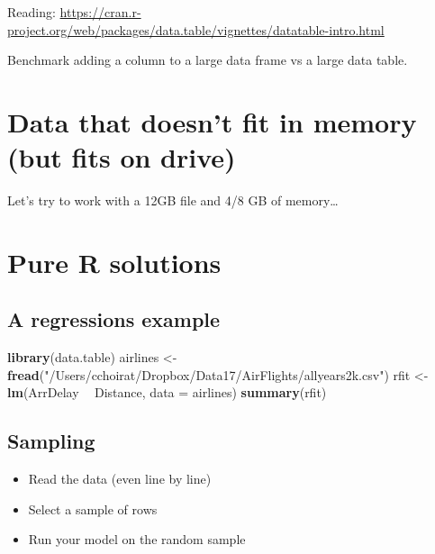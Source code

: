 \documentclass[]{book}
\newenvironment{Shaded}{\begin{snugshade}}{\end{snugshade}}
\newcommand{\KeywordTok}[1]{\textcolor[rgb]{0.13,0.29,0.53}{\textbf{#1}}}
\newcommand{\DataTypeTok}[1]{\textcolor[rgb]{0.13,0.29,0.53}{#1}}
\newcommand{\StringTok}[1]{\textcolor[rgb]{0.31,0.60,0.02}{#1}}
\newcommand{\OperatorTok}[1]{\textcolor[rgb]{0.81,0.36,0.00}{\textbf{#1}}}
\newcommand{\NormalTok}[1]{#1}
\providecommand{\tightlist}{%
  \setlength{\itemsep}{0pt}\setlength{\parskip}{0pt}}
\theoremstyle{definition}
\theoremstyle{definition}
\theoremstyle{definition}
\theoremstyle{remark}
\let\BeginKnitrBlock\begin \let\EndKnitrBlock\end
\begin{document}
Reading:
\url{https://cran.r-project.org/web/packages/data.table/vignettes/datatable-intro.html}

\BeginKnitrBlock{exercise}
\protect\hypertarget{exr:unnamed-chunk-111}{}{\label{exr:unnamed-chunk-111}
}Benchmark adding a column to a large data frame vs a large data table.
\EndKnitrBlock{exercise}

\section{Data that doesn't fit in memory (but fits on
drive)}\label{data-that-doesnt-fit-in-memory-but-fits-on-drive}

Let's try to work with a 12GB file and 4/8 GB of memory\ldots{}

\section{Pure R solutions}\label{pure-r-solutions}

\subsection{A regressions example}\label{a-regressions-example}

\begin{Shaded}
\begin{Highlighting}[]
\KeywordTok{library}\NormalTok{(data.table)}
\NormalTok{airlines <-}\StringTok{ }\KeywordTok{fread}\NormalTok{(}\StringTok{"/Users/cchoirat/Dropbox/Data17/AirFlights/allyears2k.csv"}\NormalTok{)}
\NormalTok{rfit <-}\StringTok{ }\KeywordTok{lm}\NormalTok{(ArrDelay }\OperatorTok{~}\StringTok{ }\NormalTok{Distance, }\DataTypeTok{data =}\NormalTok{ airlines)}
\KeywordTok{summary}\NormalTok{(rfit)}
\end{Highlighting}
\end{Shaded}

\subsection{Sampling}\label{sampling}

\begin{itemize}
\tightlist
\item
  Read the data (even line by line)
\item
  Select a sample of rows
\item
  Run your model on the random sample
\end{itemize}
\end{document}
